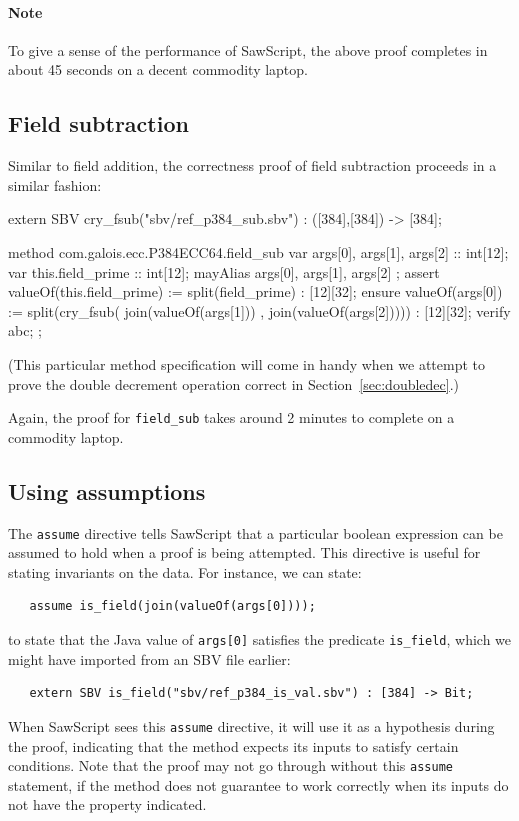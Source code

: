 \documentclass[12pt]{galois-whitepaper}
\newcommand{\sawScript}{{\sc SawScript}\xspace}
\begin{document}
\paragraph{Note} To give a sense of the performance of \sawScript, the above proof completes in about 45 seconds on a decent commodity laptop.

\subsection{Field subtraction}
Similar to field addition, the correctness proof of field subtraction proceeds in a similar fashion:

\begin{code}
  extern SBV cry_fsub("sbv/ref_p384_sub.sbv") : ([384],[384]) -> [384];

  method com.galois.ecc.P384ECC64.field_sub {
    var args[0], args[1], args[2] :: int[12];
    var this.field_prime :: int[12];
    mayAlias { args[0], args[1], args[2] };
    assert valueOf(this.field_prime) := split(field_prime) : [12][32];
    ensure valueOf(args[0]) :=
         split(cry_fsub( join(valueOf(args[1]))
                       , join(valueOf(args[2])))) : [12][32];
    verify abc;
  };
\end{code}

(This particular method specification will come in handy when we attempt to prove the double decrement operation correct in Section~\ref{sec:doubledec}.)

Again, the proof for {\tt field\_sub} takes around 2 minutes to complete on a commodity laptop.

\subsection{Using assumptions}

The {\tt assume} directive tells \sawScript that a particular boolean expression can be assumed to hold when a proof is being attempted. This directive is
useful for stating invariants on the data. For instance, we can state:
\begin{Verbatim}
   assume is_field(join(valueOf(args[0]))); 
\end{Verbatim}
to state that the Java value of {\tt args[0]} satisfies the predicate {\tt is\_field}, which we might have
imported from an SBV file earlier:
\begin{Verbatim}
   extern SBV is_field("sbv/ref_p384_is_val.sbv") : [384] -> Bit;
\end{Verbatim}
When \sawScript sees this {\tt assume} directive, it will use it as a hypothesis during the proof, indicating that the method expects its inputs to
satisfy certain conditions. Note that the proof may not go through without this {\tt assume} statement, if the method does not guarantee to work
correctly when its inputs do not have the property indicated.
\end{document}
